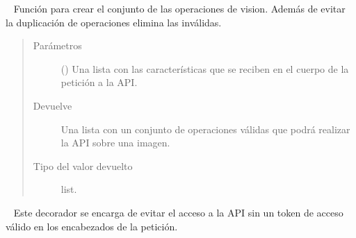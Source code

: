 \begin{fulllineitems}
\label{\detokenize{chapter_two/desc_cloudnao:app.utils.auxiliar_functions.create_set_of_features}}~
Función para crear el conjunto de las operaciones de vision. Además de evitar
la duplicación de operaciones elimina las inválidas.
\begin{quote}\begin{description}
\item[{Parámetros}] \leavevmode
{} () \textendash{} Una lista con las características que se reciben en el cuerpo de la petición a la API.

\item[{Devuelve}] \leavevmode
Una lista con un conjunto de operaciones válidas que podrá realizar la API sobre una imagen.

\item[{Tipo del valor devuelto}] \leavevmode
list.

\end{description}\end{quote}

\end{fulllineitems}


\begin{fulllineitems}
\label{\detokenize{chapter_two/desc_cloudnao:app.utils.auxiliar_functions.require_api_key}}~
Este decorador se encarga de evitar el acceso a la API sin un token de acceso
válido en los encabezados de la petición.

\end{fulllineitems}


